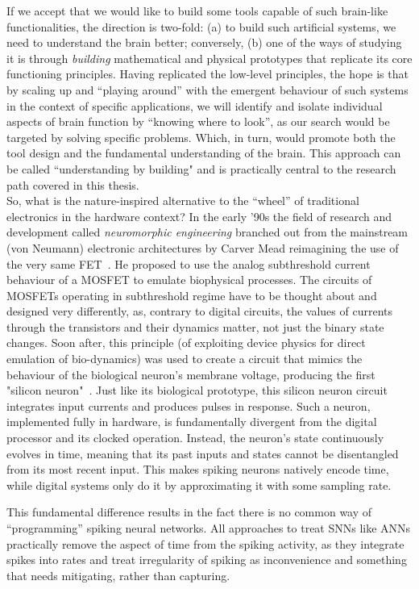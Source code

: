 If we accept that we would like to build some tools capable of such brain-like functionalities, the direction is two-fold: (a) to build such artificial systems, we need to understand the brain better; conversely, (b) one of the ways of studying it is through \emph{building} mathematical and physical prototypes that replicate its core functioning principles. Having replicated the low-level principles, the hope is that by scaling up and ``playing around'' with the emergent behaviour of such systems in the context of specific applications, we will identify and isolate individual aspects of brain function by ``knowing where to look'', as our search would be targeted by solving specific problems. Which, in turn, would promote both the tool design and the fundamental understanding of the brain. This approach can be called ``understanding by building" and is practically central to the research path covered in this thesis.\\

So, what is the nature-inspired alternative to the ``wheel'' of traditional electronics in the hardware context? In the early '90s the field of research and development called \emph{neuromorphic engineering} branched out from the mainstream (von Neumann) electronic architectures by Carver Mead reimagining the use of the very same \ac{FET}~\cite{Mead90}. He proposed to use the analog subthreshold current behaviour of a MOSFET to emulate biophysical processes. The circuits of MOSFETs operating in subthreshold regime have to be thought about and designed very differently, as, contrary to digital circuits, the values of currents through the transistors and their dynamics matter, not just the binary state changes. Soon after, this principle (of exploiting device physics for direct emulation of bio-dynamics) was used to create a circuit that mimics the behaviour of the biological neuron's membrane voltage, producing the first "silicon neuron"~\cite{Mahowald_Douglas91}. Just like its biological prototype, this silicon neuron circuit integrates input currents and produces pulses in response. Such a neuron, implemented fully in hardware, is fundamentally divergent from the digital processor and its clocked operation. Instead, the neuron's state continuously evolves in time, meaning that its past inputs and states cannot be disentangled from its most recent input. This makes spiking neurons natively encode time, while digital systems only do it by approximating it with some sampling rate.

This fundamental difference results in the fact there is no common way of ``programming'' spiking neural networks. All approaches to treat SNNs like ANNs practically remove the aspect of time from the spiking activity, as they integrate spikes into rates and treat irregularity of spiking as inconvenience and something that needs mitigating, rather than capturing.

